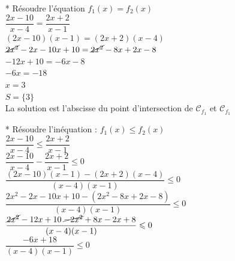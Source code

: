 \begin{enumerate}
\begin{itemize}
\item [*] Résoudre l'équation $f_1(x) = f_2(x)$\\

$ \dfrac{2x - 10}{x - 4} = \dfrac{2x + 2}{x - 1} $ \\

$ (2x - 10) ( x - 1) = (2x + 2) (x - 4) $ \\
$ \cancel{2x^2} -2x -10x +10 = \cancel{2x^2} -8x +2x -8 $\\
$ -12x +10 = -6x -8 $\\
$ -6x = -18 $ \\
$ x = 3 $ \\

$S = \{3\}$ \\

La solution est l'abscisse du point d'intersection de $\mathcal{C}_{f_1}$ et  $\mathcal{C}_{f_1}$\\

\newpage
             
\item [*] Résoudre l'inéquation : $f_1(x) \leqslant f_2(x)$\\

$ \dfrac{2x - 10}{x - 4} \leqslant \dfrac{2x + 2}{x - 1} $ \\

$ \dfrac{2x - 10}{x - 4}  - \dfrac{2x + 2}{x - 1} \leqslant 0 $ \\

$ \dfrac{(2x - 10) (x - 1) -  (2x + 2) ( x - 4) }{(x - 4)(x - 1)} \leqslant 0 $ \\

$ \dfrac{2x^2 -2x -10x +10 - (2x^2 -8x +2x -8) }{(x - 4)(x - 1)} \leqslant 0 $ \\

$ \dfrac{\cancel{2x^2} -12x +10 \; \cancel{-2x^2} +8x -2x +8 }
                                                 {(x - 4)(x - 1)} \leqslant 0 $ \\
                                                 
$ \dfrac{-6x +18}{(x-4)(x-1)}  \leqslant 0 $ \\                                                




\end{itemize}
\end{enumerate}
